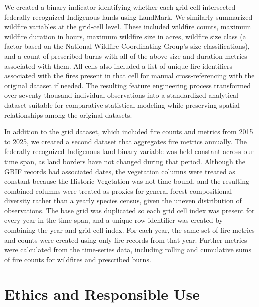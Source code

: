 \documentclass[
  letterpaper,
  DIV=11,
  numbers=noendperiod]{scrartcl}
\begin{document}
\hspace{0pt}We created a binary indicator identifying whether each grid
cell intersected federally recognized Indigenous lands using LandMark.
We similarly summarized wildfire variables at the grid-cell level. These
included wildfire counts, maximum wildfire duration in hours, maximum
wildfire size in acres, wildfire size class (a factor based on the
National Wildfire Coordinating Group's size classifications), and a
count of prescribed burns with all of the above size and duration
metrics associated with them. All cells also included a list of unique
fire identifiers associated with the fires present in that cell for
manual cross-referencing with the original dataset if needed. The
resulting feature engineering process transformed over seventy thousand
individual observations into a standardized analytical dataset suitable
for comparative statistical modeling while preserving spatial
relationships among the original datasets.

In addition to the grid dataset, which included fire counts and metrics
from 2015 to 2025, we created a second dataset that aggregates fire
metrics annually. The federally recognized Indigenous land binary
variable was held constant across our time span, as land borders have
not changed during that period. Although the GBIF records had associated
dates, the vegetation columns were treated as constant because the
Historic Vegetation was not time-bound, and the resulting combined
columns were treated as proxies for general forest compositional
diversity rather than a yearly species census, given the uneven
distribution of observations. The base grid was duplicated so each grid
cell index was present for every year in the time span, and a unique row
identifier was created by combining the year and grid cell index. For
each year, the same set of fire metrics and counts were created using
only fire records from that year. Further metrics were calculated from
the time-series data, including rolling and cumulative sums of fire
counts for wildfires and prescribed burns.

\section{Ethics and Responsible Use}\label{ethics-and-responsible-use}
\end{document}
